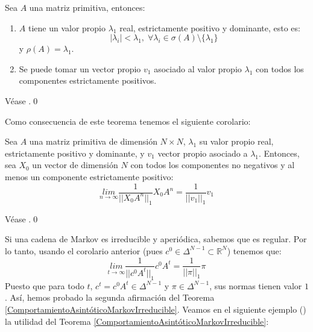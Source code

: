 \begin{theorem}
    Sea $A$ una matriz primitiva, entonces:
    \begin{enumerate}
        \item $A$ tiene un valor propio $\lambda_1$ real, estrictamente positivo y dominante, esto es:
        \[|\lambda_i|<\lambda_1,\; \forall\lambda_i\in\sigma(A)\setminus \{\lambda_1\}\]
        y $\rho(A)=\lambda_1$.
        \item Se puede tomar un vector propio $v_1$ asociado al valor propio $\lambda_1$ con todos los componentes estrictamente positivos.
    \end{enumerate}
\end{theorem}
\begin{proofs*}
    Véase \cite[Página 199, Teoremas 5.12 y 5.13]{Salinelli}.\qed
\end{proofs*}
Como consecuencia de este teorema tenemos el siguiente corolario:
\begin{corollary}
    Sea $A$ una matriz primitiva de dimensión $N\times N$, $\lambda_1$ su valor propio real, estrictamente positivo y dominante, y $v_1$ vector propio asociado a $\lambda_1$. Entonces, sea $X_0$ un vector de dimensión $N$ con todos los componentes no negativos y al menos un componente estrictamente positivo:
    \[\underset{n\rightarrow\infty}{lim}\frac{1}{||X_0A^n||_1}X_0A^n=\frac{1}{||v_1||_1}v_1\]
\end{corollary}
\begin{proofs*}
    Véase \cite[Página 201, Teorema 5.19]{Salinelli}.\qed
\end{proofs*}
Si una cadena de Markov es irreducible y aperiódica, sabemos que es regular. Por lo tanto, usando el corolario anterior (pues $c^0\in\Delta^{N-1}\subset\mathbb{R}^N$) tenemos que:
    \[\underset{t\rightarrow\infty}{lim}\frac{1}{||c^0A^t||_1}c^0A^t=\frac{1}{||\pi||_1}\pi\]
Puesto que para todo $t$, $c^t=c^0A^t\in\Delta^{N-1}$ y $\pi\in\Delta^{N-1}$, sus normas tienen valor $1$. Así, hemos probado la segunda afirmación del Teorema \ref{ComportamientoAsintóticoMarkovIrreducible}. Veamos en el siguiente ejemplo (\cite[Página 102]{Matrices_positivas}) la utilidad del Teorema \ref{ComportamientoAsintóticoMarkovIrreducible}: 


